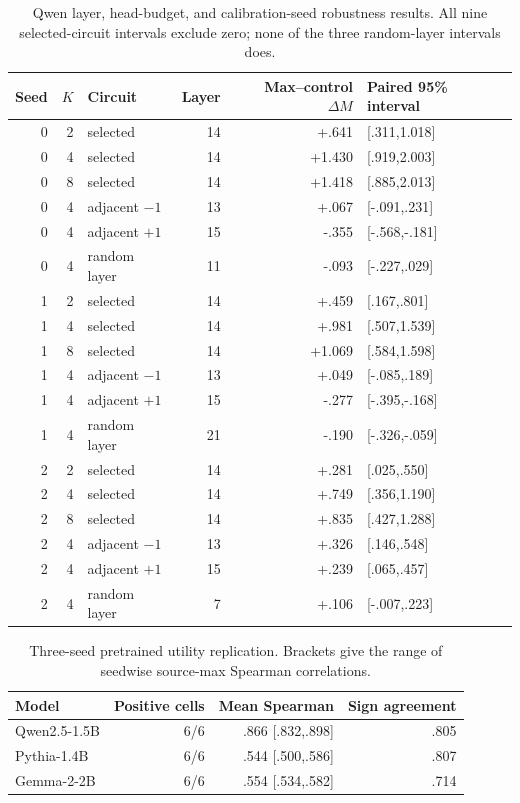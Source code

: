 \documentclass[letterpaper]{article} %
\begin{document}
\begin{table}[t]
\centering
\small
\setlength{\tabcolsep}{3.0pt}
\begin{tabular}{rrlrrl}
\toprule
Seed & $K$ & Circuit & Layer & Max--control $\Delta M$ & Paired 95\% interval \\
\midrule
0 & 2 & selected & 14 & +.641 & [.311,1.018] \\
0 & 4 & selected & 14 & +1.430 & [.919,2.003] \\
0 & 8 & selected & 14 & +1.418 & [.885,2.013] \\
0 & 4 & adjacent $-1$ & 13 & +.067 & [-.091,.231] \\
0 & 4 & adjacent $+1$ & 15 & -.355 & [-.568,-.181] \\
0 & 4 & random layer & 11 & -.093 & [-.227,.029] \\
\midrule
1 & 2 & selected & 14 & +.459 & [.167,.801] \\
1 & 4 & selected & 14 & +.981 & [.507,1.539] \\
1 & 8 & selected & 14 & +1.069 & [.584,1.598] \\
1 & 4 & adjacent $-1$ & 13 & +.049 & [-.085,.189] \\
1 & 4 & adjacent $+1$ & 15 & -.277 & [-.395,-.168] \\
1 & 4 & random layer & 21 & -.190 & [-.326,-.059] \\
\midrule
2 & 2 & selected & 14 & +.281 & [.025,.550] \\
2 & 4 & selected & 14 & +.749 & [.356,1.190] \\
2 & 8 & selected & 14 & +.835 & [.427,1.288] \\
2 & 4 & adjacent $-1$ & 13 & +.326 & [.146,.548] \\
2 & 4 & adjacent $+1$ & 15 & +.239 & [.065,.457] \\
2 & 4 & random layer & 7 & +.106 & [-.007,.223] \\
\bottomrule
\end{tabular}
\caption{Qwen layer, head-budget, and calibration-seed robustness results. All nine selected-circuit
intervals exclude zero; none of the three random-layer intervals does.}
\label{tab:supp-selection-robustness}
\end{table}

\begin{table}[t]
\centering
\small
\setlength{\tabcolsep}{3.0pt}
\begin{tabular}{lrrr}
\toprule
Model & Positive cells & Mean Spearman & Sign agreement \\
\midrule
Qwen2.5-1.5B & 6/6 & .866 [.832,.898] & .805 \\
Pythia-1.4B & 6/6 & .544 [.500,.586] & .807 \\
Gemma-2-2B & 6/6 & .554 [.534,.582] & .714 \\
\bottomrule
\end{tabular}
\caption{Three-seed pretrained utility replication. Brackets give the range of seedwise source-max
Spearman correlations.}
\label{tab:supp-utility-replication}
\end{table}
\end{document}
